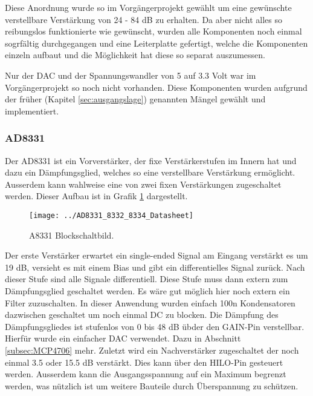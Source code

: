 Diese Anordnung wurde so im Vorgängerprojekt gewählt um eine gewünschte verstellbare Verstärkung von 24 - 84 dB zu erhalten.
Da aber nicht alles so reibungslos funktionierte wie gewünscht, wurden alle Komponenten noch einmal sogrfältig durchgegangen und eine Leiterplatte gefertigt, welche die Komponenten einzeln aufbaut und die Möglichkeit hat diese so separat auszumessen.

Nur der DAC und der Spannungswandler von 5 auf 3.3 Volt war im Vorgängerprojekt so noch nicht vorhanden. Diese Komponenten wurden aufgrund der früher (Kapitel \ref{sec:ausgangslage}) genannten Mängel gewählt und implementiert.

\subsubsection{AD8331}

Der AD8331\cite{AD8331} ist ein Vorverstärker, der fixe Verstärkerstufen im Innern hat und dazu ein Dämpfungsglied, welches so eine verstellbare Verstärkung ermöglicht. Ausserdem kann wahlweise eine von zwei fixen Verstärkungen zugeschaltet werden. Dieser Aufbau ist in Grafik \ref{fig:AD8331} dargestellt.

\begin{figure}[H]
\begin{center}
    \texttt{[image: ../AD8331\_8332\_8334\_Datasheet]}
    \caption{A8331 Blockschaltbild.}
    \label{fig:AD8331}
\end{center}
\end{figure}

Der erste Verstärker erwartet ein single-ended Signal am Eingang verstärkt es um 19 dB, versieht es mit einem Bias und gibt ein differentielles Signal zurück. Nach dieser Stufe sind alle Signale differentiell.
Diese Stufe muss dann extern zum Dämpfungsglied geschaltet werden. Es wäre gut möglich hier noch extern ein Filter zuzuschalten. In dieser Anwendung wurden einfach 100n Kondensatoren dazwischen geschaltet um noch einmal DC zu blocken.
Die Dämpfung des Dämpfungsgliedes ist stufenlos von 0 bis 48 dB übder den GAIN-Pin verstellbar. Hierfür wurde ein einfacher DAC verwendet. Dazu in Abschnitt \ref{subsec:MCP4706} mehr.
Zuletzt wird ein Nachverstärker zugeschaltet der noch einmal 3.5 oder 15.5 dB verstärkt. Dies kann über den HILO-Pin gesteuert werden.
Ausserdem kann die Ausgangsspannung auf ein Maximum begrenzt werden, was nützlich ist um weitere Bauteile durch Überspannung zu schützen.

